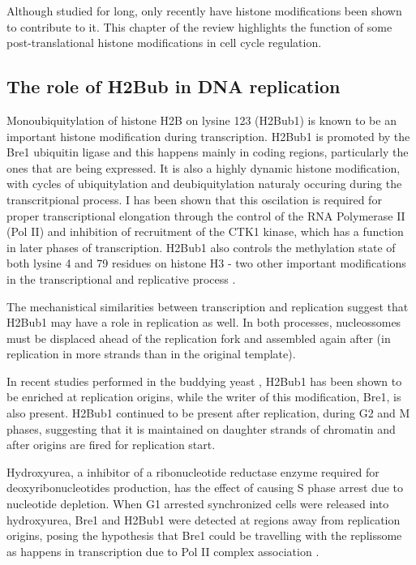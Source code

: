 \documentclass[11pt,twoside,a4paper]{report}
\begin{document}
	Although studied for long, only recently have histone modifications been shown to contribute to it. This chapter of the review highlights the function of some post-translational histone modifications in cell cycle regulation.
		
		\subsection{The role of H2Bub in DNA replication}
		Monoubiquitylation of histone H2B on lysine 123 (H2Bub1) is known to be an important histone modification during transcription. H2Bub1 is promoted by the Bre1 ubiquitin ligase and this happens mainly in coding regions, particularly the ones that are being expressed. It is also a highly dynamic histone modification, with cycles of ubiquitylation and deubiquitylation naturaly occuring during the transcritpional process. I has been shown that this oscilation is required for proper transcriptional elongation through the control of the RNA Polymerase II (Pol II) and inhibition of recruitment of the CTK1 kinase, which has a function in later phases of transcription. H2Bub1 also controls the methylation state of both lysine 4 and 79 residues on histone H3 - two other important modifications in the transcriptional and replicative process \cite{Kouzarides2007}.
		
		The mechanistical similarities between transcription and replication suggest that H2Bub1 may have a role in replication as well. In both processes, nucleossomes must be displaced ahead of the replication fork and assembled again after (in replication in more strands than in the original template).
		
		In recent studies performed in the buddying yeast  \cite{Trujillo2012}, H2Bub1 has been shown to be enriched at replication origins, while the writer of this modification, Bre1, is also present. H2Bub1 continued to be present after replication, during G2 and M phases, suggesting that it is maintained on daughter strands of chromatin and after origins are fired for replication start.
		
		Hydroxyurea, a inhibitor of a ribonucleotide reductase enzyme required for deoxyribonucleotides production, has the effect of causing S phase arrest due to nucleotide depletion. When G1 arrested synchronized cells were released into hydroxyurea, Bre1 and H2Bub1 were detected at regions away from replication origins, posing the hypothesis that Bre1 could be travelling with the replissome as happens in transcription due to Pol II complex association \cite{Trujillo2012}.
		
\end{document}
